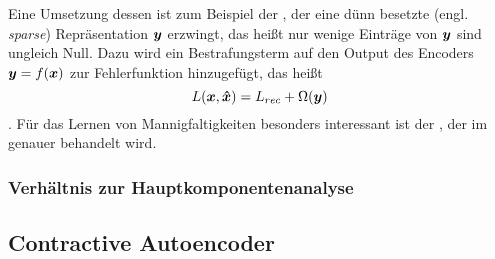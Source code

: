 Eine Umsetzung dessen ist zum Beispiel der , der eine dünn besetzte
(engl. \textit{sparse}) Repräsentation $\bm{y}$ erzwingt, das heißt nur wenige Einträge von
$\bm{y}$ sind ungleich Null. Dazu wird ein Bestrafungsterm auf den Output des Encoders $\bm{y}
	= f(\bm{x})$ zur Fehlerfunktion hinzugefügt, das heißt
\begin{equation}
	L(\bm{x}, \bm{\hat{x}}) = L_{rec} + \Omega(\bm{y})
\end{equation} \Parencite[505]{Goodfellow.2016}. Für das Lernen von Mannigfaltigkeiten besonders interessant ist der
\addref %
, der im  genauer
behandelt wird.

\subsubsection{Verhältnis zur Hauptkomponentenanalyse}

\subsection{Contractive Autoencoder}
\label{ch:MethodenDerDimRed:ML:CAE}
